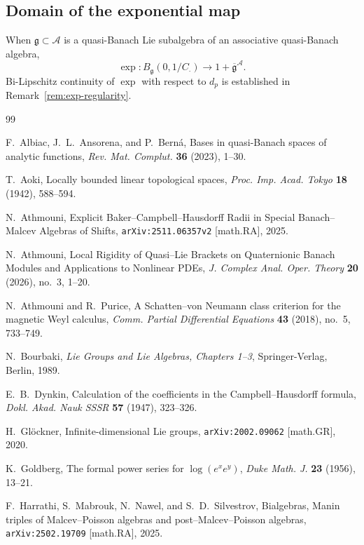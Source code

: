 \documentclass[10pt]{amsart}
\theoremstyle{definition}
\theoremstyle{remark}
\numberwithin{equation}{section}
\newcommand{\Cmult}{C_{\cdot}}       %
\begin{document}
\subsection{Domain of the exponential map}

When $\mathfrak{g} \subset \mathcal{A}$ is a quasi-Banach Lie subalgebra of an
associative quasi-Banach algebra,
\[
  \exp: B_{\mathfrak{g}}(0, 1/\Cmult) \longrightarrow 1 + \overline{\mathfrak{g}}^{\mathcal{A}}.
\]
Bi-Lipschitz continuity of $\exp$ with respect to $d_p$ is established in
Remark~\ref{rem:exp-regularity}.

\begin{thebibliography}{99}

F.~Albiac, J.~L.~Ansorena, and P.~Bern\'a,
Bases in quasi-Banach spaces of analytic functions,
\textit{Rev. Mat. Complut.} \textbf{36} (2023), 1--30.

T.~Aoki,
Locally bounded linear topological spaces,
\textit{Proc. Imp. Acad. Tokyo} \textbf{18} (1942), 588--594.

N.~Athmouni,
Explicit Baker--Campbell--Hausdorff Radii in Special Banach--Malcev Algebras of Shifts,
\texttt{arXiv:2511.06357v2} [math.RA], 2025.

N.~Athmouni,
Local Rigidity of Quasi--Lie Brackets on Quaternionic Banach Modules and Applications to Nonlinear PDEs,
\textit{J. Complex Anal. Oper. Theory} \textbf{20} (2026), no.~3, 1--20.

N.~Athmouni and R.~Purice,
A Schatten--von Neumann class criterion for the magnetic Weyl calculus,
\textit{Comm. Partial Differential Equations} \textbf{43} (2018), no.~5, 733--749.

N.~Bourbaki,
\textit{Lie Groups and Lie Algebras, Chapters 1--3},
Springer-Verlag, Berlin, 1989.

E.~B.~Dynkin,
Calculation of the coefficients in the Campbell--Hausdorff formula,
\textit{Dokl. Akad. Nauk SSSR} \textbf{57} (1947), 323--326.

H.~Gl\"ockner,
Infinite-dimensional Lie groups,
\texttt{arXiv:2002.09062} [math.GR], 2020.

K.~Goldberg,
The formal power series for $\log(e^x e^y)$,
\textit{Duke Math. J.} \textbf{23} (1956), 13--21.

F.~Harrathi, S.~Mabrouk, N.~Nawel, and S.~D.~Silvestrov,
Bialgebras, Manin triples of Malcev--Poisson algebras and post--Malcev--Poisson algebras,
\texttt{arXiv:2502.19709} [math.RA], 2025.


\end{thebibliography}
\end{document}
